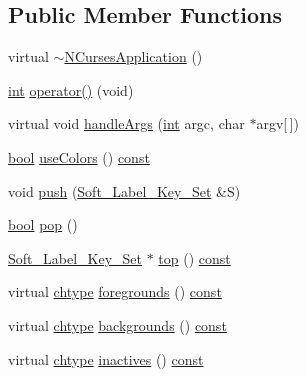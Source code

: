 \subsection*{Public Member Functions}
\begin{DoxyCompactItemize}
\item 
virtual \hyperlink{class_n_curses_application_af0dc1dae5b9e8a9e0707154960aa507a}{$\sim$\-N\-Curses\-Application} ()
\item 
\hyperlink{term__entry_8h_ad65b480f8c8270356b45a9890f6499ae}{int} \hyperlink{class_n_curses_application_ae94357ea7cdb977e4cd55948d40e1227}{operator()} (void)
\item 
virtual void \hyperlink{class_n_curses_application_a922b5c0200d3ccb9f23275dde554c042}{handle\-Args} (\hyperlink{term__entry_8h_ad65b480f8c8270356b45a9890f6499ae}{int} argc, char $\ast$argv\mbox{[}$\,$\mbox{]})
\item 
\hyperlink{term__entry_8h_a002004ba5d663f149f6c38064926abac}{bool} \hyperlink{class_n_curses_application_acb442a275dcde797e05bc446a15981b7}{use\-Colors} () \hyperlink{term__entry_8h_a57bd63ce7f9a353488880e3de6692d5a}{const} 
\item 
void \hyperlink{class_n_curses_application_a36d28b32d72f7694192426097d053b1f}{push} (\hyperlink{class_soft___label___key___set}{Soft\-\_\-\-Label\-\_\-\-Key\-\_\-\-Set} \&S)
\item 
\hyperlink{term__entry_8h_a002004ba5d663f149f6c38064926abac}{bool} \hyperlink{class_n_curses_application_a3cc6b3e7b18164fc18e57e337ba70933}{pop} ()
\item 
\hyperlink{class_soft___label___key___set}{Soft\-\_\-\-Label\-\_\-\-Key\-\_\-\-Set} $\ast$ \hyperlink{class_n_curses_application_a8f28bec9e888adefb0b5253361e10b0f}{top} () \hyperlink{term__entry_8h_a57bd63ce7f9a353488880e3de6692d5a}{const} 
\item 
virtual \hyperlink{curses_8priv_8h_ad21482314c581139d01159829e841e51}{chtype} \hyperlink{class_n_curses_application_ad1b440ce99b9554a2b33d7f73bff99ae}{foregrounds} () \hyperlink{term__entry_8h_a57bd63ce7f9a353488880e3de6692d5a}{const} 
\item 
virtual \hyperlink{curses_8priv_8h_ad21482314c581139d01159829e841e51}{chtype} \hyperlink{class_n_curses_application_a6624b3f67674e2dd7aadb51f3ff62474}{backgrounds} () \hyperlink{term__entry_8h_a57bd63ce7f9a353488880e3de6692d5a}{const} 
\item 
virtual \hyperlink{curses_8priv_8h_ad21482314c581139d01159829e841e51}{chtype} \hyperlink{class_n_curses_application_a481fea32ada884c0d5fa8068d0faaa2d}{inactives} () \hyperlink{term__entry_8h_a57bd63ce7f9a353488880e3de6692d5a}{const} 

\end{DoxyCompactItemize}
